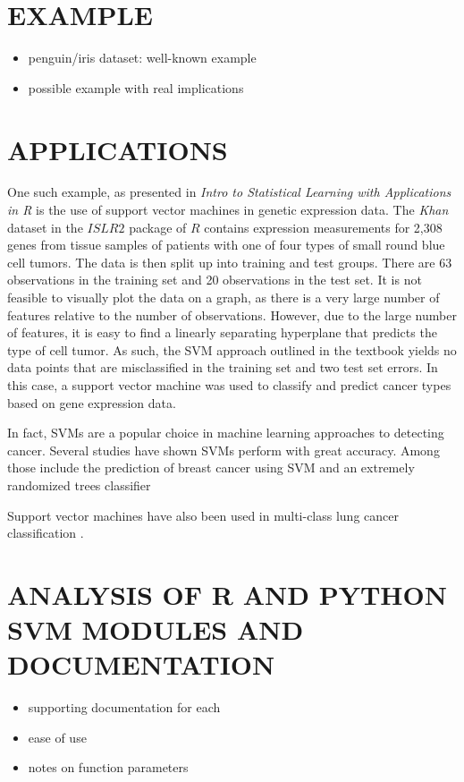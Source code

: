 \documentclass[12pt]{article}
\begin{document}
\section{EXAMPLE}
\begin{itemize}
    \item penguin/iris dataset: well-known example
    \item possible example with real implications
\end{itemize}

\section{APPLICATIONS}

One such example, as presented in \textit{Intro to Statistical Learning with Applications in R} \citep{introstatlearning} is the use of support vector machines in genetic expression data. The \textit{Khan} dataset in the $ISLR2$ package of $R$ contains expression measurements for 2,308 genes from tissue samples of patients with one of four types of small round blue cell tumors. The data is then split up into training and test groups. There are 63 observations in the training set and 20 observations in the test set. It is not feasible to visually plot the data on a graph, as there is a very large number of features relative to the number of observations. However, due to the large number of features, it is easy to find a linearly separating hyperplane that predicts the type of cell tumor. As such, the SVM approach outlined in the textbook yields no data points that are misclassified in the training set and two test set errors. In this case, a support vector machine was used to classify and predict cancer types based on gene expression data.

In fact, SVMs are a popular choice in machine learning approaches to detecting cancer. Several studies have shown SVMs perform with great accuracy. Among those include the prediction of breast cancer using SVM and an extremely randomized trees classifier \cite{breastcancer}

Support vector machines have also been used in multi-class lung cancer classification \cite{lungcancer}.

\section{ANALYSIS OF R AND PYTHON SVM MODULES AND DOCUMENTATION}

\begin{itemize}
    \item supporting documentation for each
    \item ease of use
    \item notes on function parameters
\end{itemize}

\newpage
\thispagestyle{empty}



\end{document}
